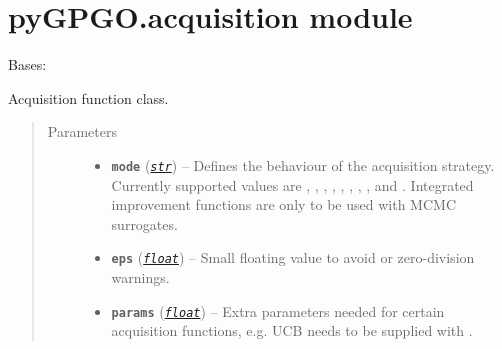 \documentclass[letterpaper,10pt,english]{sphinxmanual}
\begin{document}
\section{pyGPGO.acquisition module}
\label{pyGPGO.acquisition:pygpgo-acquisition-module}\label{pyGPGO.acquisition:module-pyGPGO.acquisition}\label{pyGPGO.acquisition::doc}

\begin{fulllineitems}
\label{pyGPGO.acquisition:pyGPGO.acquisition.Acquisition}
Bases: \href{https://docs.python.org/2/library/functions.html\#object}{}

Acquisition function class.
\begin{quote}\begin{description}
\item[{Parameters}] \leavevmode\begin{itemize}
\item {} 
\textbf{\texttt{mode}} (\href{https://docs.python.org/2/library/functions.html\#str}{\emph{\texttt{str}}}) -- Defines the behaviour of the acquisition strategy. Currently supported values are
, , ,
, , , , ,
and . Integrated improvement functions are only to be used
with MCMC surrogates.

\item {} 
\textbf{\texttt{eps}} (\href{https://docs.python.org/2/library/functions.html\#float}{\emph{\texttt{float}}}) -- Small floating value to avoid  or zero-division warnings.

\item {} 
\textbf{\texttt{params}} (\href{https://docs.python.org/2/library/functions.html\#float}{\emph{\texttt{float}}}) -- Extra parameters needed for certain acquisition functions, e.g. UCB needs
to be supplied with .

\end{itemize}

\end{description}\end{quote}


\end{fulllineitems}
\end{document}
